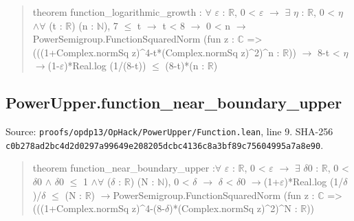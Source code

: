 \documentclass[11pt,a4paper]{article}
\begin{document}
\begin{quote}\small\ttfamily theorem function\_logarithmic\_growth : \ensuremath{\forall} \ensuremath{\varepsilon} : \ensuremath{\mathbb{R}}, 0 < \ensuremath{\varepsilon} \ensuremath{\to} \ensuremath{\exists} \ensuremath{\eta} : \ensuremath{\mathbb{R}}, 0 < \ensuremath{\eta} \ensuremath{\wedge}\newline \ensuremath{\forall} (t : \ensuremath{\mathbb{R}}) (n : \ensuremath{\mathbb{N}}), 7 \ensuremath{\leq} t \ensuremath{\to} t < 8 \ensuremath{\to} 0 < n \ensuremath{\to}\newline PowerSemigroup.FunctionSquaredNorm (fun z : \ensuremath{\mathbb{C}} =>\newline (((1+Complex.normSq z)\textasciicircum{}4-t*(Complex.normSq z)\textasciicircum{}2)\textasciicircum{}n : \ensuremath{\mathbb{R}})) \ensuremath{\to} 8-t < \ensuremath{\eta} \ensuremath{\to}\newline (1-\ensuremath{\varepsilon})*Real.log (1/(8-t)) \ensuremath{\leq} (8-t)*(n : \ensuremath{\mathbb{R}})\end{quote}
\subsection{PowerUpper.function\_near\_boundary\_upper}
Source: \texttt{proofs/opdp13/OpHack/PowerUpper/Function.lean}, line 9. SHA-256 \texttt{c0b278ad2bc4d2d0297a99649e208205dcbc4136c8a3bf89c75604995a7a8e90}.

\begin{quote}\small\ttfamily theorem function\_near\_boundary\_upper :\newline \ensuremath{\forall} \ensuremath{\varepsilon} : \ensuremath{\mathbb{R}}, 0 < \ensuremath{\varepsilon} \ensuremath{\to} \ensuremath{\exists} \ensuremath{\delta}0 : \ensuremath{\mathbb{R}}, 0 < \ensuremath{\delta}0 \ensuremath{\wedge} \ensuremath{\delta}0 \ensuremath{\leq} 1 \ensuremath{\wedge}\newline \ensuremath{\forall} (\ensuremath{\delta} : \ensuremath{\mathbb{R}}) (N : \ensuremath{\mathbb{N}}), 0 < \ensuremath{\delta} \ensuremath{\to} \ensuremath{\delta} < \ensuremath{\delta}0 \ensuremath{\to}\newline (1+\ensuremath{\varepsilon})*Real.log (1/\ensuremath{\delta})/\ensuremath{\delta} \ensuremath{\leq} (N : \ensuremath{\mathbb{R}}) \ensuremath{\to}\newline PowerSemigroup.FunctionSquaredNorm (fun z : \ensuremath{\mathbb{C}} =>\newline (((1+Complex.normSq z)\textasciicircum{}4-(8-\ensuremath{\delta})*(Complex.normSq z)\textasciicircum{}2)\textasciicircum{}N : \ensuremath{\mathbb{R}}))\end{quote}
\end{document}
